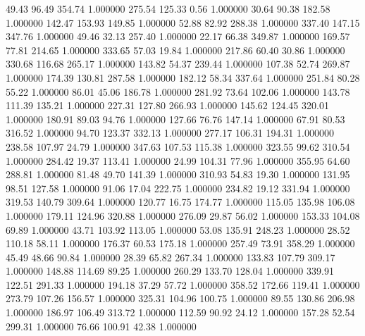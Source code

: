      49.43     96.49    354.74  1.000000
    275.54    125.33      0.56  1.000000
     30.64     90.38    182.58  1.000000
    142.47    153.93    149.85  1.000000
     52.88     82.92    288.38  1.000000
    337.40    147.15    347.76  1.000000
     49.46     32.13    257.40  1.000000
     22.17     66.38    349.87  1.000000
    169.57     77.81    214.65  1.000000
    333.65     57.03     19.84  1.000000
    217.86     60.40     30.86  1.000000
    330.68    116.68    265.17  1.000000
    143.82     54.37    239.44  1.000000
    107.38     52.74    269.87  1.000000
    174.39    130.81    287.58  1.000000
    182.12     58.34    337.64  1.000000
    251.84     80.28     55.22  1.000000
     86.01     45.06    186.78  1.000000
    281.92     73.64    102.06  1.000000
    143.78    111.39    135.21  1.000000
    227.31    127.80    266.93  1.000000
    145.62    124.45    320.01  1.000000
    180.91     89.03     94.76  1.000000
    127.66     76.76    147.14  1.000000
     67.91     80.53    316.52  1.000000
     94.70    123.37    332.13  1.000000
    277.17    106.31    194.31  1.000000
    238.58    107.97     24.79  1.000000
    347.63    107.53    115.38  1.000000
    323.55     99.62    310.54  1.000000
    284.42     19.37    113.41  1.000000
     24.99    104.31     77.96  1.000000
    355.95     64.60    288.81  1.000000
     81.48     49.70    141.39  1.000000
    310.93     54.83     19.30  1.000000
    131.95     98.51    127.58  1.000000
     91.06     17.04    222.75  1.000000
    234.82     19.12    331.94  1.000000
    319.53    140.79    309.64  1.000000
    120.77     16.75    174.77  1.000000
    115.05    135.98    106.08  1.000000
    179.11    124.96    320.88  1.000000
    276.09     29.87     56.02  1.000000
    153.33    104.08     69.89  1.000000
     43.71    103.92    113.05  1.000000
     53.08    135.91    248.23  1.000000
     28.52    110.18     58.11  1.000000
    176.37     60.53    175.18  1.000000
    257.49     73.91    358.29  1.000000
     45.49     48.66     90.84  1.000000
     28.39     65.82    267.34  1.000000
    133.83    107.79    309.17  1.000000
    148.88    114.69     89.25  1.000000
    260.29    133.70    128.04  1.000000
    339.91    122.51    291.33  1.000000
    194.18     37.29     57.72  1.000000
    358.52    172.66    119.41  1.000000
    273.79    107.26    156.57  1.000000
    325.31    104.96    100.75  1.000000
     89.55    130.86    206.98  1.000000
    186.97    106.49    313.72  1.000000
    112.59     90.92     24.12  1.000000
    157.28     52.54    299.31  1.000000
     76.66    100.91     42.38  1.000000
